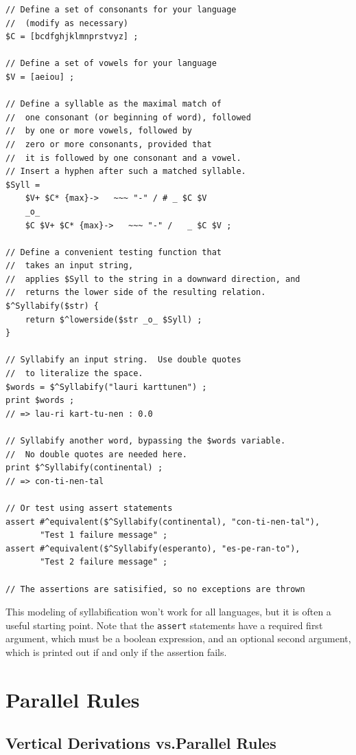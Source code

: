 \begin{Verbatim}
// Define a set of consonants for your language
// 	(modify as necessary)
$C = [bcdfghjklmnprstvyz] ;

// Define a set of vowels for your language
$V = [aeiou] ;

// Define a syllable as the maximal match of
//	one consonant (or beginning of word), followed 
//	by one or more vowels, followed by
//	zero or more consonants, provided that
//	it is followed by one consonant and a vowel.
// Insert a hyphen after such a matched syllable.
$Syll = 
    $V+ $C* {max}->   ~~~ "-" / # _ $C $V 
	_o_
    $C $V+ $C* {max}->   ~~~ "-" /   _ $C $V ;

// Define a convenient testing function that 
//	takes an input string,
//	applies $Syll to the string in a downward direction, and
//	returns the lower side of the resulting relation.
$^Syllabify($str) { 
	return $^lowerside($str _o_ $Syll) ; 
}

// Syllabify an input string.  Use double quotes
//	to literalize the space.
$words = $^Syllabify("lauri karttunen") ;
print $words ;	
// => lau-ri kart-tu-nen : 0.0

// Syllabify another word, bypassing the $words variable.
//	No double quotes are needed here.
print $^Syllabify(continental) ;
// => con-ti-nen-tal

// Or test using assert statements
assert #^equivalent($^Syllabify(continental), "con-ti-nen-tal"), 
       "Test 1 failure message" ;
assert #^equivalent($^Syllabify(esperanto), "es-pe-ran-to"), 
       "Test 2 failure message" ;

// The assertions are satisified, so no exceptions are thrown
\end{Verbatim}

\noindent
This modeling of syllabification won't work for all languages, but it is often a
useful starting point.  Note that the \texttt{assert} statements have a
required first argument, which must be a boolean expression, and an
optional second argument, which is printed out if and only if the
assertion fails.

\section{Parallel Rules}

\subsection{Vertical Derivations vs.\@ Parallel Rules}

